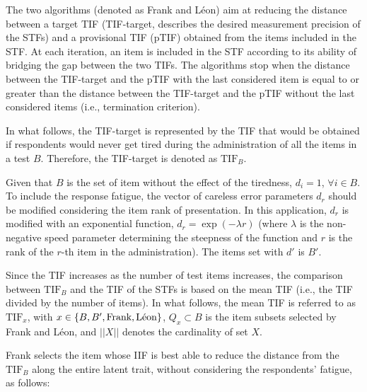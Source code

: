 \documentclass{svproc}
\begin{document}
The two algorithms (denoted as Frank and Léon) aim at reducing the distance between a target TIF (TIF-target, describes the desired measurement precision of the STFs) and a provisional TIF (pTIF) obtained from the items included in the STF. 
At each iteration, an item is included in the STF according to its ability of bridging the gap between the two TIFs. 
The algorithms stop when the distance between the TIF-target and the pTIF with the last considered item is equal to or greater than the distance between the TIF-target and the pTIF without the last considered items (i.e., termination criterion). 

In what follows, the TIF-target is represented by the TIF that would be obtained if respondents would never get tired during the administration of all the items in a test $B$. Therefore, the TIF-target is denoted as  $\text{TIF}_B$.

Given that $B$ is the set of item without the effect of the tiredness, $d_i = 1$, $\forall i \in B$. To include the response fatigue, the vector of careless error parameters $d_r$ should be modified considering the item rank of presentation. In this application, $d_r$ is modified with an exponential function, $d_r = \exp(-\lambda r)$ (where $\lambda$ is the non-negative speed parameter determining the steepness of the function and $r$ is the rank of the $r$-th item in the administration). 
The items set with $d'$ is $B'$.

Since the TIF increases as the number of test items increases, the comparison between $\text{TIF}_B$ and the TIF of the STFs is based on the mean TIF (i.e., the TIF divided by the number of items). 
In what follows, the mean TIF  is referred to as $\text{TIF}_{x}$, with $x \in \{B, B', \text{Frank}, \text{\text{Léon}}\}$, $Q_x \subset B$ is the item subsets selected by Frank and Léon, and $||X||$ denotes the cardinality of set $X$.




Frank selects the item whose IIF is best able to reduce the distance from the $\text{TIF}_B$ along the entire latent trait, without considering the respondents' fatigue, as follows:
\end{document}
